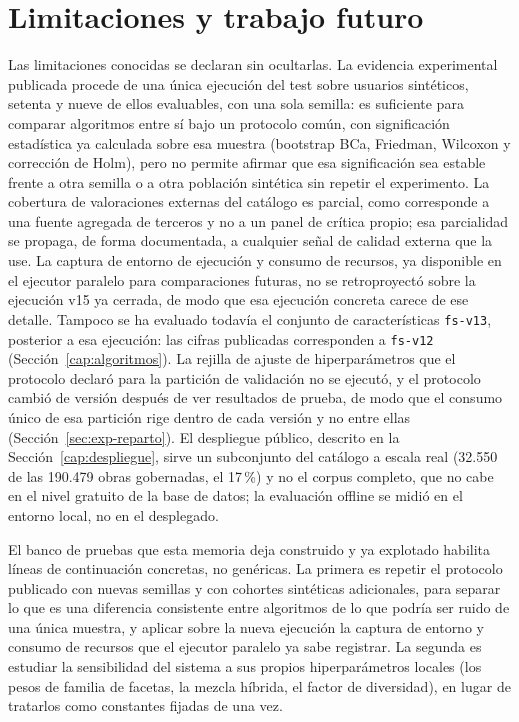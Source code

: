 \section{Limitaciones y trabajo futuro}\label{sec:conc-limitaciones}\label{sec:conc-trabajo-futuro}

Las limitaciones conocidas se declaran sin ocultarlas. La evidencia experimental publicada
procede de una única ejecución del test sobre usuarios sintéticos, setenta y nueve de ellos
evaluables, con una sola semilla: es suficiente para comparar algoritmos entre sí bajo un
protocolo común, con significación estadística ya calculada sobre esa muestra (bootstrap BCa,
Friedman, Wilcoxon y corrección de Holm), pero no permite afirmar que esa significación sea
estable frente a otra semilla o a otra población sintética sin repetir el experimento. La
cobertura de valoraciones externas del catálogo es parcial, como corresponde a una fuente
agregada de terceros y no a un panel de crítica propio; esa parcialidad se propaga, de forma
documentada, a cualquier señal de calidad externa que la use. La captura de entorno de
ejecución y consumo de recursos, ya disponible en el ejecutor paralelo para comparaciones
futuras, no se retroproyectó sobre la ejecución v15 ya cerrada, de modo que esa ejecución
concreta carece de ese detalle. Tampoco se ha evaluado todavía el conjunto de características
\texttt{fs-v13}, posterior a esa ejecución: las cifras publicadas corresponden a \texttt{fs-v12}
(Sección~\ref{cap:algoritmos}). La rejilla de ajuste de hiperparámetros que el protocolo declaró para la partición de
validación no se ejecutó, y el protocolo cambió de versión después de ver resultados de prueba, de modo que el consumo
único de esa partición rige dentro de cada versión y no entre ellas (Sección~\ref{sec:exp-reparto}). El despliegue público, descrito en la
Sección~\ref{cap:despliegue}, sirve un subconjunto del catálogo a escala real (32.550 de las 190.479 obras
gobernadas, el 17\,\%) y no el corpus completo, que no cabe en el nivel gratuito de la base de datos; la evaluación
offline se midió en el entorno local, no en el desplegado.

El banco de pruebas que esta memoria deja construido y ya explotado habilita líneas de
continuación concretas, no genéricas. La primera es repetir el protocolo publicado con nuevas
semillas y con cohortes sintéticas adicionales, para separar lo que es una diferencia
consistente entre algoritmos de lo que podría ser ruido de una única muestra, y aplicar sobre la nueva ejecución la captura de entorno y consumo de recursos que el
ejecutor paralelo ya sabe registrar. La segunda es estudiar la sensibilidad del sistema a sus propios
hiperparámetros locales (los pesos de familia de facetas, la mezcla híbrida, el factor de
diversidad), en lugar de tratarlos como constantes fijadas de una vez.

